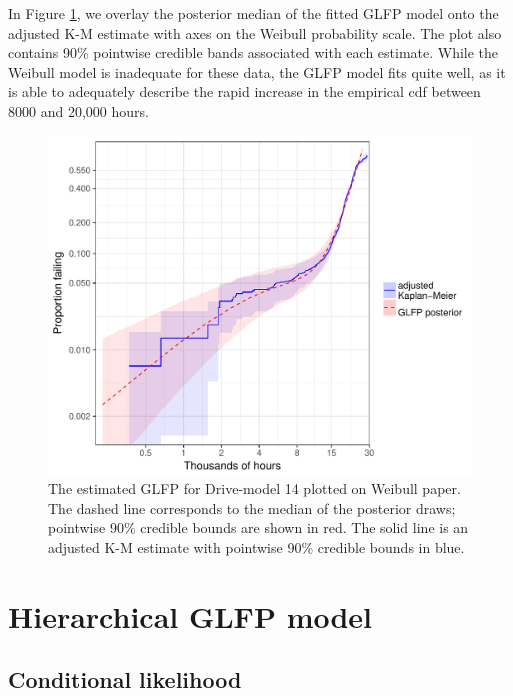 \documentclass[12pt]{article}
\begin{document}
In Figure \ref{ex1-overlay}, we overlay the posterior median of the fitted GLFP model onto the adjusted K-M estimate with axes on the Weibull probability scale.  The plot also contains 90\% pointwise credible bands associated with each estimate. While the Weibull model is inadequate for these data, the GLFP model fits quite well, as it is able to adequately describe the rapid increase in the empirical cdf between 8000 and 20,000 hours. %

\begin{figure}[H]
\centering
  \includegraphics[width=.8\textwidth]{km14-prob-plus}
  \caption{The estimated GLFP for Drive-model 14 plotted on Weibull paper.  The dashed line corresponds to the median of the posterior draws; pointwise 90\% credible bounds are shown in red.  The solid line is an adjusted K-M estimate with pointwise 90\% credible bounds in blue.}
  \label{ex1-overlay}
\end{figure}


\section{Hierarchical GLFP model}
\label{sec:Hierarchical GLFP model}
\subsection{Conditional likelihood}
\end{document}
